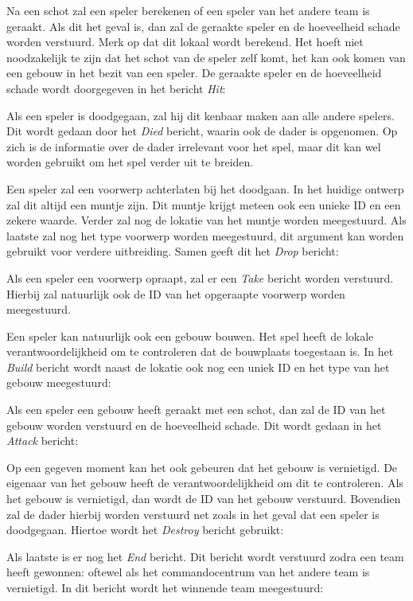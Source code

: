 Na een schot zal een speler berekenen of een speler van het andere team is geraakt. Als dit het geval is, dan zal de geraakte speler en de hoeveelheid schade worden verstuurd. Merk op dat dit lokaal wordt berekend. Het hoeft niet noodzakelijk te zijn dat het schot van de speler zelf komt, het kan ook komen van een gebouw in het bezit van een speler. De geraakte speler en de hoeveelheid schade wordt doorgegeven in het bericht \emph{Hit}:

Als een speler is doodgegaan, zal hij dit kenbaar maken aan alle andere spelers. Dit wordt gedaan door het \emph{Died} bericht, waarin ook de dader is opgenomen. Op zich is de informatie over de dader irrelevant voor het spel, maar dit kan wel worden gebruikt om het spel verder uit te breiden.

Een speler zal een voorwerp achterlaten bij het doodgaan. In het huidige ontwerp zal dit altijd een muntje zijn. Dit muntje krijgt meteen ook een unieke ID en een zekere waarde. Verder zal nog de lokatie van het muntje worden meegestuurd. Als laatste zal nog het type voorwerp worden meegestuurd, dit argument kan worden gebruikt voor verdere uitbreiding. Samen geeft dit het \emph{Drop} bericht:

Als een speler een voorwerp opraapt, zal er een \emph{Take} bericht worden verstuurd. Hierbij zal natuurlijk ook de ID van het opgeraapte voorwerp worden meegestuurd.

Een speler kan natuurlijk ook een gebouw bouwen. Het spel heeft de lokale verantwoordelijkheid om te controleren dat de bouwplaats toegestaan is. In het \emph{Build} bericht wordt naast de lokatie ook nog een uniek ID en het type van het gebouw meegestuurd:

Als een speler een gebouw heeft geraakt met een schot, dan zal de ID van het gebouw worden verstuurd en de hoeveelheid schade. Dit wordt gedaan in het \emph{Attack} bericht:

Op een gegeven moment kan het ook gebeuren dat het gebouw is vernietigd. De eigenaar van het gebouw heeft de verantwoordelijkheid om dit te controleren. Als het gebouw is vernietigd, dan wordt de ID van het gebouw verstuurd. Bovendien zal de dader hierbij worden verstuurd net zoals in het geval dat een speler is doodgegaan. Hiertoe wordt het \emph{Destroy} bericht gebruikt:

Als laatste is er nog het \emph{End} bericht. Dit bericht wordt verstuurd zodra een team heeft gewonnen: oftewel als het commandocentrum van het andere team is vernietigd. In dit bericht wordt het winnende team meegestuurd:
